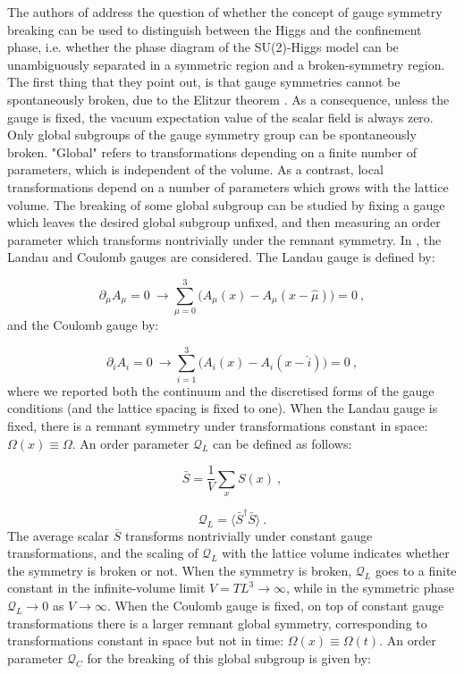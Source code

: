 The authors of \cite{Caudy:2007sf} address the question of whether the concept of gauge symmetry breaking can be used to distinguish between the Higgs and the confinement phase, i.e. whether the phase diagram of the SU(2)-Higgs model can be unambiguously separated in a symmetric region and a broken-symmetry region. The first thing that they point out, is that gauge symmetries cannot be spontaneously broken, due to the Elitzur theorem \cite{Elitzur:1975im}. As a consequence, unless the gauge is fixed, the vacuum expectation value of the scalar field is always zero. Only global subgroups of the gauge symmetry group can be spontaneously broken. "Global" refers to transformations depending on a finite number of parameters, which is independent of the volume. As a contrast, local transformations depend on a number of parameters which grows with the lattice volume. The breaking of some global subgroup can be studied by fixing a gauge which leaves the desired global subgroup unfixed, and then measuring an order parameter which transforms nontrivially under the remnant symmetry. In \cite{Caudy:2007sf}, the Landau and Coulomb gauges are considered. The Landau gauge is defined by:

\begin{equation}
\partial_{\mu} A_{\mu} = 0 \:  \rightarrow \sum_{\mu =0}^3 \bigl( A_{\mu}(x) - A_{\mu}(x - \hat\mu) \bigr) = 0 \: ,
\end{equation}
%
and the Coulomb gauge by:

\begin{equation}
\partial_i A_i = 0 \: \rightarrow \sum_{i =1}^3 \bigl( A_i (x) - A_i(x - \hat i) \bigr) = 0 \: ,
\end{equation}
%
where we reported both the continuum and the discretised forms of the gauge conditions (and the lattice spacing is fixed to one). When the Landau gauge is fixed, there is a remnant symmetry under transformations constant in space: $\Omega (x) \equiv \Omega$. An order parameter $\mathcal Q_L$ can be defined as follows: 

\begin{equation}
\bar S = \frac{1}{V} \sum_{x} S(x) \: ,
\end{equation}

\begin{equation}
\mathcal Q_L = \langle \bar S^{\dagger} \bar S \rangle \: .
\end{equation}
%
The average scalar $\bar S$ transforms nontrivially under constant gauge transformations, and the scaling of $\mathcal Q_L$ with the lattice volume indicates whether the symmetry is broken or not. When the symmetry is broken, $\mathcal Q_L$ goes to a finite constant in the infinite-volume limit $V = TL^3 \to \infty$, while in the symmetric phase $\mathcal Q_L \to 0$ as $V \to \infty$.
When the Coulomb gauge is fixed, on top of constant gauge transformations there is a larger remnant global symmetry, corresponding to transformations constant in space but not in time: $\Omega (x) \equiv \Omega (t)$. An order parameter $\mathcal Q_C$ for the breaking of this global subgroup is given by:

